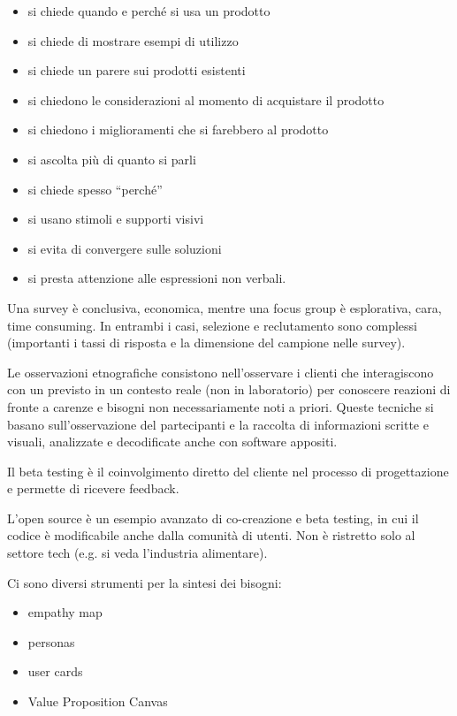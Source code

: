\documentclass[answers, a4paper, 11pt]{exam}
\begin{document}
\begin{itemize}
    \item si chiede quando e perché si usa un prodotto
    \item si chiede di mostrare esempi di utilizzo
    \item si chiede un parere sui prodotti esistenti
    \item si chiedono le considerazioni al momento di acquistare il prodotto
    \item si chiedono i miglioramenti che si farebbero al prodotto
    \item si ascolta più di quanto si parli
    \item si chiede spesso ``perché''
    \item si usano stimoli e supporti visivi
    \item si evita di convergere sulle soluzioni
    \item si presta attenzione alle espressioni non verbali.
\end{itemize}

Una survey è conclusiva, economica, mentre una focus group è esplorativa, cara, time consuming. In entrambi i casi, selezione e reclutamento sono complessi (importanti i tassi di risposta e la dimensione del campione nelle survey).

Le osservazioni etnografiche consistono nell'osservare i clienti che interagiscono con un previsto in un contesto reale (non in laboratorio) per conoscere reazioni di fronte a carenze e bisogni non necessariamente noti a priori.
Queste tecniche si basano sull'osservazione del partecipanti e la raccolta di informazioni scritte e visuali, analizzate e decodificate anche con software appositi.

Il beta testing è il coinvolgimento diretto del cliente nel processo di progettazione e permette di ricevere feedback.

L'open source è un esempio avanzato di co-creazione e beta testing, in cui il codice è modificabile anche dalla comunità di utenti. Non è ristretto solo al settore tech (e.g. si veda l'industria alimentare).

Ci sono diversi strumenti per la sintesi dei bisogni:
\begin{itemize}
    \item empathy map
    \item personas
    \item user cards
    \item Value Proposition Canvas
\end{itemize}
\end{document}
